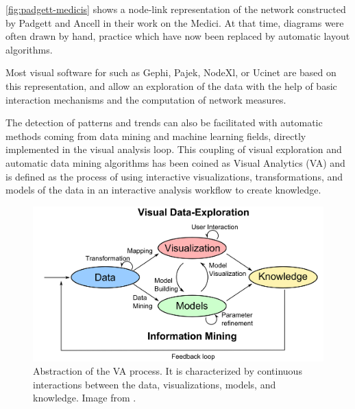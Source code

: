 \autoref{fig:padgett-medicis} shows a node-link representation of the network constructed by Padgett and Ancell in their work on the Medici.
At that time, diagrams were often drawn by hand, practice which have now been replaced by automatic layout algorithms.

Most visual software for \sna such as Gephi\cite{Gephi}, Pajek\cite{pajek}, NodeXl\cite{NodeXL}, or Ucinet\cite{ucinet} are based on this representation, and allow an exploration of the data with the help of basic interaction mechanisms and the computation of network measures.


The detection of patterns and trends can also be facilitated with automatic methods coming from data mining and machine learning fields, directly implemented in the visual analysis loop.
This coupling of visual exploration and automatic data mining algorithms has been coined as Visual Analytics (VA) and is defined as the process of using interactive visualizations, transformations, and models of the data in an interactive analysis workflow to create knowledge\cite{keimVisualAnalyticsDefinition2008}.

\begin{figure}[!ht]
    \centering %
    \includegraphics[width=1\textwidth]{static/figures/RelatedWork/Keim-VisualAnalytics.png}
    \caption{Abstraction of the VA process. It is characterized by continuous interactions between the data, visualizations, models, and knowledge. Image from \cite{keimVisualAnalyticsDefinition2008}.}
    \label{fig:keim-va}
\end{figure}

